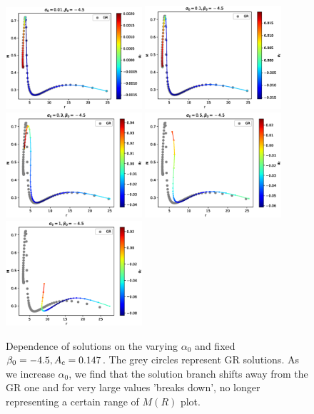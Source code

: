 \documentclass[12pt]{article}
\numberwithin{equation}{section}
\begin{document}
\begin{figure}
    \centering
    \includegraphics[width=0.45\textwidth, clip=True]{MofR_alpha001.eps} \includegraphics[width=0.45\textwidth, clip=True]{MofR_alpha01.eps} \\
    \includegraphics[width=0.45\textwidth, clip=True]{MofR_alpha03.eps} \includegraphics[width=0.45\textwidth, clip=True]{MofR_alpha05.eps} \\
    \includegraphics[width=0.45\textwidth, clip=True]{MofR_alpha1.eps}
    \caption{Dependence of solutions on the varying $\alpha_0$ and fixed $\beta_0 = -4.5, A_{\rm c} = 0.147$. The grey circles represent GR solutions. As we increase $\alpha_0$, we find that the solution branch shifts away from the GR one and for very large values 'breaks down', no longer representing a certain range of $M(R)$ plot.}
    \label{fig:alpha_var}
\end{figure}
\end{document}

